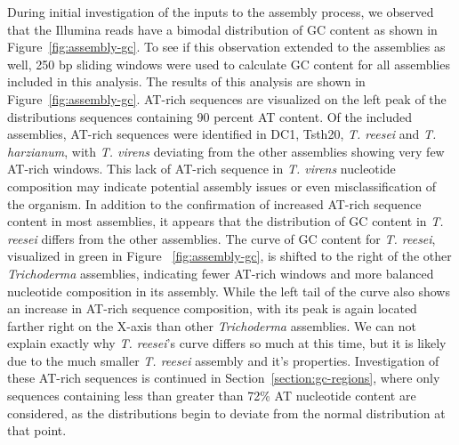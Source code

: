 During initial investigation of the inputs to the assembly process, we
observed that the Illumina reads have a bimodal distribution of GC
content as shown in Figure~\ref{fig:assembly-gc}. To see if this
observation extended to the assemblies as well, 250 bp sliding windows
were used to calculate GC content for all assemblies included in this
analysis. The results of this analysis are shown in
Figure~\ref{fig:assembly-gc}. AT-rich sequences are visualized on the
left peak of the distributions sequences containing 90 percent AT
content. Of the included assemblies, AT-rich sequences were identified
in DC1, Tsth20, \textit{T. reesei} and \textit{T. harzianum}, with
\textit{T. virens} deviating from the other assemblies showing very
few AT-rich windows. This lack of AT-rich sequence in
\textit{T. virens} nucleotide composition may indicate potential
assembly issues or even misclassification of the organism. In addition
to the confirmation of increased AT-rich sequence content in most
assemblies, it appears that the distribution of GC content in
\textit{T. reesei} differs from the other assemblies. The curve of GC
content for \textit{T. reesei}, visualized in green in Figure
~\ref{fig:assembly-gc}, is shifted to the right of the other
\textit{Trichoderma} assemblies, indicating fewer AT-rich windows and
more balanced nucleotide composition in its assembly. While the left
tail of the curve also shows an increase in AT-rich sequence
composition, with its peak is again located farther right on the
X-axis than other \textit{Trichoderma} assemblies. We can not explain
exactly why \textit{T. reesei}'s curve differs so much at this time,
but it is likely due to the much smaller \textit{T. reesei} assembly
and it's properties. Investigation of these AT-rich sequences is
continued in Section~\ref{section:gc-regions}, where only sequences
containing less than greater than 72\% AT nucleotide content are
considered, as the distributions begin to deviate from the normal
distribution at that point.


